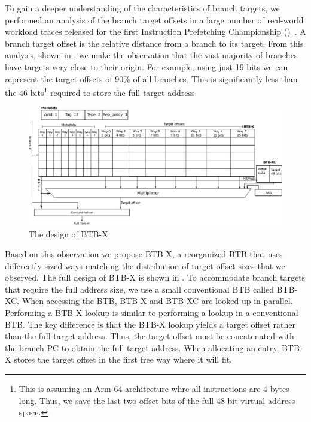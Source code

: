 \documentclass[../main.tex]{subfiles}
\begin{document}
\begin{refsection}
To gain a deeper understanding of the characteristics of branch
targets, we performed an analysis of the branch target offsets in a
large number of real-world workload traces released for the first
Instruction Prefetching Championship ()~\cite{ipc1}. A branch
target offset is the relative distance from a branch to its target. From this
analysis, shown in , we make the observation
that the vast majority of branches have targets very close to their
origin. For example, using just 19 bits we can represent the target
offsets of 90\% of all branches. This is significantly less than the
46 bits\footnote{This is assuming an Arm-64 architecture whre all
  instructions are 4 bytes long. Thus, we save the last two offset
  bits of the full 48-bit virtual address space.} required to store
the full target address.

\begin{figure}[ht]
  \centering
  \includegraphics[width=\textwidth]{figures/BTB-X.pdf}
  \caption{\label{fig:btbx-design} The design of BTB-X.}
\end{figure}

Based on this observation we propose BTB-X, a reorganized BTB that
uses differently sized ways matching the distribution of target offset
sizes that we observed. The full design of BTB-X is shown in
. To accommodate branch targets that require the
full address size, we use a small conventional BTB called BTB-XC. When
accessing the BTB, BTB-X and BTB-XC are looked up in
parallel. Performing a BTB-X lookup is similar to performing a lookup
in a conventional BTB. The key difference is that the BTB-X lookup
yields a target offset rather than the full target address. Thus, the
target offset must be concatenated with the branch PC to obtain the
full target address. When allocating an entry, BTB-X stores the target
offset in the first free way where it will fit.


\end{refsection}
\end{document}
